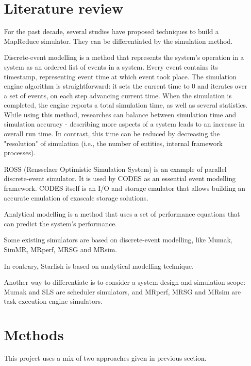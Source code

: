 \documentclass[conference]{IEEEtran} \IEEEoverridecommandlockouts
\begin{document}
    \section{Literature review} 
    \label{literature_review} 


    For the past decade, several studies have proposed techniques to build a MapReduce simulator. They can be differentiated by the simulation method. 

    Discrete-event modelling is a method that represents the system's operation in a system as an ordered list of events in a system. Every event contains its timestamp, representing event time at which event took place. The simulation engine algorithm is straightforward: it sets the current time to 0 and iterates over a set of events, on each step advancing current time. When the simulation is completed, the engine reports a total simulation time, as well as several statistics. While using this method, researches can balance between simulation time and simulation accuracy - describing more aspects of a system leads to an increase in overall run time. In contrast, this time can be reduced by decreasing the "resolution" of simulation (i.e., the number of entities, internal framework processes).

    ROSS (Rensselaer Optimistic Simulation System) is an example of parallel discrete-event simulator. It is used by CODES as an essential event modelling framework. CODES itself is an I/O and storage emulator that allows building an accurate emulation of exascale storage solutions.

    Analytical modelling is a method that uses a set of performance equations that can predict the system's performance. 

    Some existing simulators are based on discrete-event modelling, like Mumak, SimMR, MRperf, MRSG and MRsim. 

    In contrary, Starfish is based on analytical modelling technique.

    Another way to differentiate is to consider a system design and simulation scope: Mumak and SLS are scheduler simulators, and MRperf, MRSG and MRsim are task execution engine simulators.


    \section{Methods} 


    This project uses a mix of two approaches given in previous section.
\end{document}
